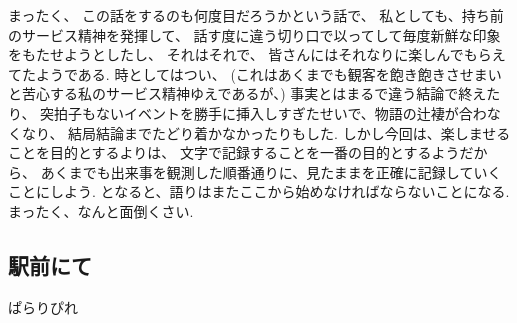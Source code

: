 まったく、
この話をするのも何度目だろうかという話で、
私としても、持ち前のサービス精神を発揮して、
話す度に違う切り口で以ってして毎度新鮮な印象をもたせようとしたし、
それはそれで、
皆さんにはそれなりに楽しんでもらえてたようである.
時としてはつい、
(これはあくまでも観客を飽き飽きさせまいと苦心する私のサービス精神ゆえであるが、)
事実とはまるで違う結論で終えたり、
突拍子もないイベントを勝手に挿入しすぎたせいで、物語の辻褄が合わなくなり、
結局結論までたどり着かなかったりもした.
しかし今回は、楽しませることを目的とするよりは、
文字で記録することを一番の目的とするようだから、
あくまでも出来事を観測した順番通りに、見たままを正確に記録していくことにしよう.
となると、語りはまたここから始めなければならないことになる.
まったく、なんと面倒くさい.

\subsection*{駅前にて}

ぱらりぴれ

